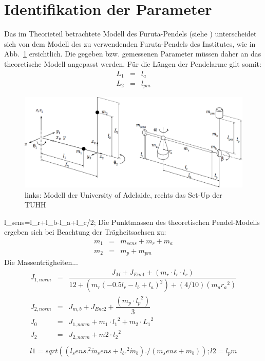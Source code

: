 \section{Identifikation der Parameter}

Das im Theorieteil betrachtete Modell des Furuta-Pendels (siehe \citep{Cazzolato.2011}) unterscheidet sich von dem Modell des zu verwendenden Furuta-Pendels des Institutes, wie in Abb.~\ref{fig.parameter} 
ersichtlich.
Die gegeben bzw. gemessenen Parameter müssen daher an das theoretische Modell angepasst werden. Für die Längen der Pendelarme gilt somit:
\begin{eqnarray}
L_1 &=& l_a \nonumber \\
L_2 &=& l_{pm}

\end{eqnarray}

\begin{figure}[htbp]
	\centering	
	\includegraphics[width=1\textwidth]{Grafiken/ParameterFuruta.png}
	\caption{links: Modell der University of Adelaide, rechts das Set-Up der TUHH}
	\label{fig.parameter}
\end{figure}
l_sens=l_r+l_b-l_a+l_c/2;
Die Punktmassen des theoretischen Pendel-Modells ergeben sich bei Beachtung der Trägheitsachsen zu:
\begin{eqnarray}
m_1 &=& m_{sens}+m_r+m_a \nonumber \\
m_2 &=& m_p+m_{pm}
\end{eqnarray}
Die Massenträgheiten... %
\begin{eqnarray}
J_{1,norm}&=&\dfrac{J_M +J_{Enc1}+(m_r \cdot l_r \cdot l_r)}{12+(m_r (-0.5 l_r-l_b+l_a)^2)+(4/10) (m_a  {r_a}^{2})} \\
J_{2,norm}&=& J_{m,b}+J_{Enc2}   + \dfrac{(m_p \cdot {l_p}^{2})}{3} \\
J_0&=&J_{1,norm}+ m_1 \cdot {l_1}^{2} + m_2 \cdot {L_1}^{2} \\ 
J_2&=&J_{2,norm}+m2 \cdot {l_2}^2           \\
\end{eqnarray}
\begin{eqnarray}
l1=sqrt((l_sens.^2 \dot m_sens+l_b.^2 \dot m_b)./(m_sens+m_b));
l2=l_pm
\end{eqnarray}

